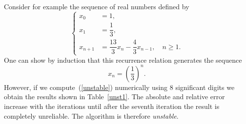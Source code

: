 Consider for example the sequence of real numbers defined by
%
\begin{equation}
  \label{unstable}
  \left\{
    \begin{aligned}
      x_0 & = 1, \\
      x_1 & = \dfrac{1}{3}, \\
      x_{n+1} & = \dfrac{13}{3} x_n - \dfrac{4}{3} x_{n-1}, \quad n \ge 1 .
    \end{aligned}
  \right.
\end{equation}
%
One can show by induction that this recurrence relation generates the
sequence
%
\begin{equation*}
  x_n = \left ( \frac{1}{3} \right )^n . 
\end{equation*}
%
However, if we compute~(\ref{unstable}) numerically using 8
significant digits we obtain the results shown in Table~\ref{unst1}.
The absolute and relative error increase with the iterations until
after the seventh iteration the result is completely unreliable.
The algorithm is therefore \textit{unstable}.    

